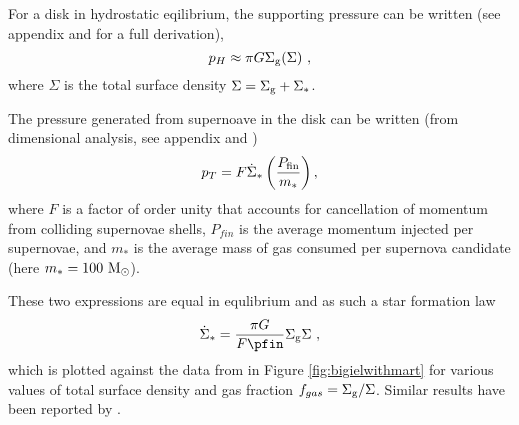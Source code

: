 For a disk in hydrostatic eqilibrium, the supporting pressure can be written (see appendix and \citet{ostriker2011} for a full derivation),
\begin{equation}
\label{eqn:hydeq}
p_H \approx \pi G \Sigma_\mathrm{g} (\Sigma)~,
\end{equation}
where $\Sigma$ is the total surface density $\Sigma = \Sigma_\mathrm{g} + \Sigma_*$.

The pressure generated from supernoave in the disk can be written (from dimensional analysis, see appendix and \citet{martizzi2015})
\begin{equation}
\label{eqn:turb}
p_T = F \dot{\Sigma}_* \left(\frac{P_\mathrm{fin}}{m_*}\right),
\end{equation}
where $F$ is a factor of order unity that accounts for cancellation of momentum from colliding supernovae shells, $P_{fin}$ is the average momentum injected per supernovae, and $m_*$ is the average mass of gas consumed per supernova candidate (here $m_* = 100 ~\mathrm{M}_{\odot}$).

These two expressions are equal in equlibrium and as such a star formation law
\begin{equation}
\label{eqn:martsfr}
\sfr = \frac{\pi G}{F \pfin} \sg \Sigma~,
\end{equation}
which is plotted against the data from \citet{bigiel2008} in Figure \ref{fig:bigielwithmart} for various values of total surface density and gas fraction $f_{gas} = \Sigma_\mathrm{g}/\Sigma$.
Similar results have been reported by \citep{ostriker2011}.
